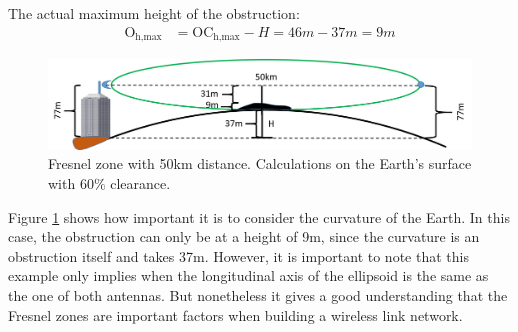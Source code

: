 The actual maximum height of the obstruction:
\begin{align}
\text{O}_{\text{h,max}} &= \text{OC}_{\text{h,max}} - H = 46m - 37m = 9m
\label{height_max_with_curv}
\end{align}

\begin{figure}[H]
	\centering
	\includegraphics[scale=0.50]{figures/fresnel_50km_curvature_obstacle.png}
	\caption{Fresnel zone with 50km distance. Calculations on the Earth's surface with 60$\%$ clearance.}
	\label{fig:fresnel_50km_curvature_obstacle}
\end{figure}  

Figure \ref{fig:fresnel_50km_curvature_obstacle} shows how important it is to consider the curvature of the Earth. In this case, the obstruction can only be at a height of 9m, since the curvature is an obstruction itself and takes 37m. However, it is important to note that this example only implies when the longitudinal axis of the ellipsoid is the same as the one of both antennas. But nonetheless it gives a good understanding that the Fresnel zones are important factors when building a wireless link network.
